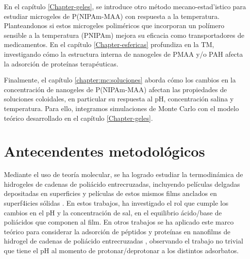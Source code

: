 En el cap\'itulo \ref{Chapter-geles}, se introduce otro m\'etodo mecano-estad'istico para estudiar microgeles de P(NIPAm-MAA) con respuesta a la temperatura.
Planteandonos si estos  microgeles polim\'ericos que incorporan un pol\'imero sensible a la temperatura (PNIPAm)  mejora su eficacia como transportadores de medicamentos. En el cap\'itulo \ref{Chapter-esfericas} profundiza en la TM, investigando c\'omo la estructura interna de nanogeles de PMAA y/o PAH afecta la adsorci\'on de prote\'inas terap\'euticas.

Finalmente, el cap\'itulo \ref{chapter:mc:soluciones} aborda c\'omo los cambios en la concentraci\'on de nanogeles de P(NIPAm-MAA) afectan las propiedades de soluciones coloidales, en particular su respuesta al pH, concentraci\'on salina y temperatura. Para ello, integramos simulaciones de Monte Carlo con el modelo te\'orico desarrollado en el  cap\'itulo \ref{Chapter-geles}.


\section{Antecendentes metodol\'ogicos}\label{sec:intro:metodologicos}

Mediante el uso de teor\'ia  molecular, se ha logrado estudiar la termodin\'amica de hidrogeles de cadenas de poli\'acido entrecruzadas, incluyendo pel\'iculas delgadas depositadas en superficies \cite{longo2012molecular,nap2006weak} y pel\'iculas  de estos mismos films anclados en superf4icies s\'olidas \cite{longo2014non,longo2014equilibrium}.
En estos trabajos, \citet{longo2014equilibrium} ha investigado el rol que cumple los cambios en el pH y la concentraci\'on de sal, en el equilibrio \'acido/base de poli\'acidos que componen al film. En otros trabajos se ha aplicado este marco te\'orico para considerar la adsorci\'on de p\'eptidos y prote\'inas en nanofilms de hidrogel de cadenas de poli\'acido entrecruzadas \cite{longo2014equilibrium,narambuena2015lysozyme,longo2016adsorption,hagemann2018use,szleifer1997protein,fang2005kinetics}, observando el trabajo no trivial que tiene el pH al momento de protonar/deprotonar a los distintos adsorbatos.

